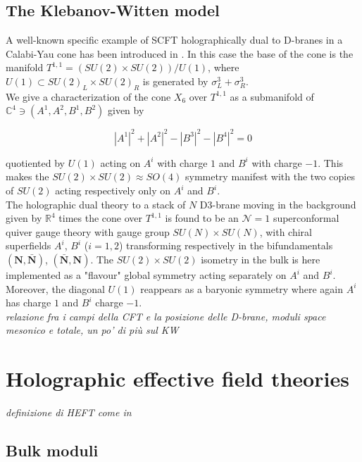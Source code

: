 \documentclass[11pt,a4paper,oneside,openright,titlepage]{book}
\newcommand{\cmmnt}[1]{\textcolor{Mahogany}{\emph{#1}}}
\begin{document}
\section{The Klebanov-Witten model}

A well-known specific example of SCFT holographically dual to D-branes in a Calabi-Yau cone has been introduced in \cite{KW_SCFT}. In this case the base of the cone is the manifold $T^{1,1} = (SU(2)\times SU(2))/U(1)$, where $U(1) \subset SU(2)_L\times SU(2)_R$ is generated by $\sigma^3_L + \sigma^3_R$.\\

We give a characterization of the cone $X_6$ over $T^{1,1}$ as a submanifold of $\mathbb{C}^4 \ni (A^1,A^2,B^1,B^2)$ given by

\begin{equation}
	|A^1|^2 + |A^2|^2 - |B^3|^2 - |B^4|^2 = 0
\end{equation}

quotiented by $U(1)$ acting on $A^i$ with charge $1$ and $B^i$ with charge $-1$. This makes the $SU(2)\times SU(2) \approx SO(4)$ symmetry manifest with the two copies of $SU(2)$ acting respectively only on $A^i$ and $B^i$.\\


The holographic dual theory to a stack of $N$ D3-brane moving in the background given by $\mathbb{R}^4$ times the cone over $T^{1,1}$ is found to be an $\mathcal{N}=1$ superconformal quiver gauge theory with gauge group $SU(N)\times SU(N)$, with chiral superfields $A^i$, $B^i$ ($i=1,2$) transforming respectively in the bifundamentals $(\mathbf{N},\mathbf{\bar N})$, $(\mathbf{\bar N},\mathbf{N})$. The $SU(2)\times SU(2)$ isometry in the bulk is here implemented as a "flavour" global symmetry acting separately on $A^i$ and $B^i$. Moreover, the diagonal $U(1)$ reappears as a baryonic symmetry where again $A^i$ has charge $1$ and $B^i$ charge $-1$.\\


\cmmnt{relazione fra i campi della CFT e la posizione delle D-brane, moduli space mesonico e totale, un po' di più sul KW}

\chapter{Holographic effective field theories}

\cmmnt{definizione di HEFT come in \cite{MZ}}

\section{Bulk moduli}
\end{document}
